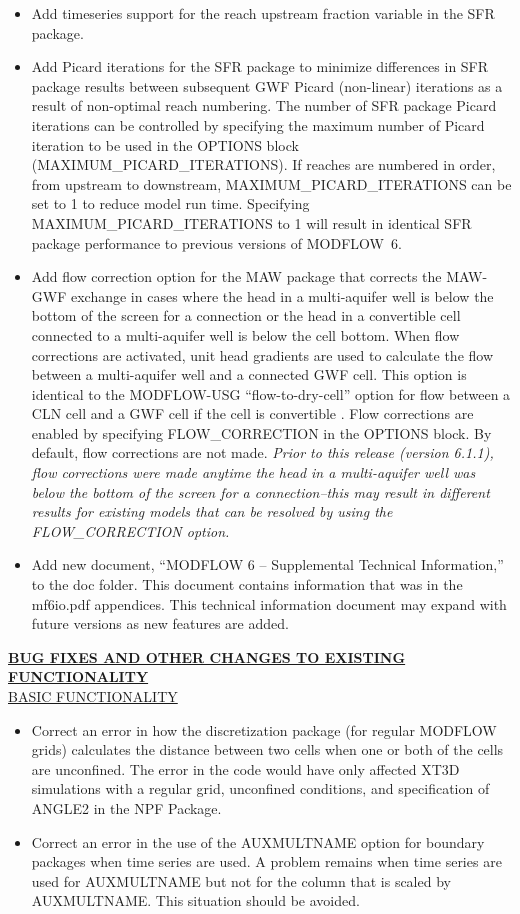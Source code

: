 \begin{itemize}
\begin{itemize}
		\item Add timeseries support for the reach upstream fraction variable in the SFR package.
		\item Add Picard iterations for the SFR package to minimize differences in SFR package results between subsequent GWF Picard (non-linear) iterations as a result of non-optimal reach numbering. The number of SFR package Picard iterations can be controlled by specifying the maximum number of Picard  iteration to be used in the OPTIONS block (MAXIMUM\_PICARD\_ITERATIONS). If reaches are numbered in order, from upstream to downstream, MAXIMUM\_PICARD\_ITERATIONS can be set to 1 to reduce model run time. Specifying  MAXIMUM\_PICARD\_ITERATIONS to 1 will result in identical SFR package performance to previous versions of MODFLOW~6.
		\item Add flow correction option for the MAW package that corrects the MAW-GWF exchange in cases where the head in a multi-aquifer well is below the bottom of the screen for a connection or the head in a convertible cell connected to a multi-aquifer well is below the cell bottom.  When flow corrections are activated, unit head gradients are used to calculate the flow between a multi-aquifer well and a connected GWF cell. This option is identical to the MODFLOW-USG ``flow-to-dry-cell'' option for flow between a CLN cell and a GWF cell if the cell is convertible \citep{modflowusg}. Flow corrections are enabled by specifying FLOW\_CORRECTION in the OPTIONS block. By default, flow corrections are not made. \emph{Prior to this release (version 6.1.1), flow corrections were made anytime the head in a multi-aquifer well was below the bottom of the screen for a connection--this may result in different results for existing models that can be resolved by using the FLOW\_CORRECTION option.}
		\item Add new document, ``MODFLOW 6 -- Supplemental Technical Information,'' to the doc folder.  This document contains information that was in the mf6io.pdf appendices.  This technical information document may expand with future versions as new features are added.
	\end{itemize}

	\textbf{\underline{BUG FIXES AND OTHER CHANGES TO EXISTING FUNCTIONALITY}} \\
	\underline{BASIC FUNCTIONALITY}
	\begin{itemize}
		\item Correct an error in how the discretization package (for regular MODFLOW grids) calculates the distance between two cells when one or both of the cells are unconfined.  The error in the code would have only affected XT3D simulations with a regular grid, unconfined conditions, and specification of ANGLE2 in the NPF Package.  
		\item Correct an error in the use of the AUXMULTNAME option for boundary packages when time series are used.  A problem remains when time series are used for AUXMULTNAME but not for the column that is scaled by AUXMULTNAME.  This situation should be avoided.
	\end{itemize}


\end{itemize}
